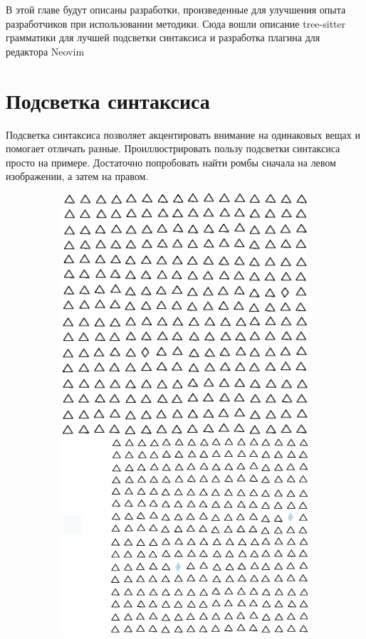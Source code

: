 \documentclass[14pt, openany]{report}
\begin{document}
В этой главе будут описаны разработки, произведенные для улучшения опыта разработчиков при использовании методики. Сюда вошли описание tree-sitter \cite{treeSitter} грамматики для лучшей подсветки синтаксиса и разработка плагина для редактора Neovim \cite{nvim}

\section{Подсветка синтаксиса}
Подсветка синтаксиса позволяет акцентировать внимание на одинаковых вещах и помогает отличать разные. Проиллюстрировать пользу подсветки синтаксиса просто на примере. Достаточно попробовать найти ромбы сначала на левом изображении, а затем на правом.

\begin{figure}[h]
  \centering
  \begin{subfigure}{\linewidth}
    \includegraphics[scale=0.8]{uncolored}\hfill
    \includegraphics[scale=0.8]{colored}

\end{subfigure}
\end{figure}
\end{document}
